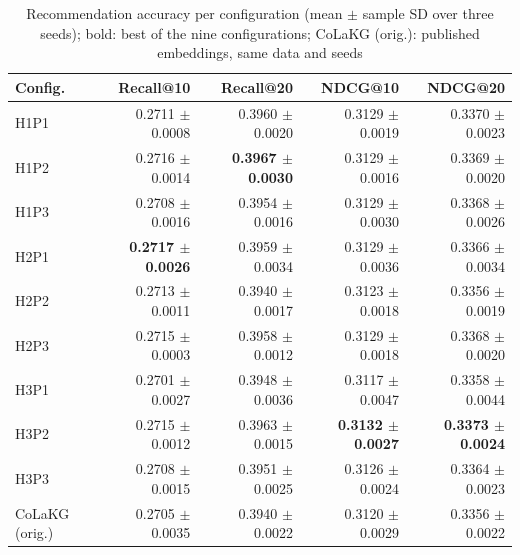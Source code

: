 \begin{table}[H]
\centering
\small
\begin{tabular}{lrrrr}
\toprule
Config. & Recall@10 & Recall@20 & NDCG@10 & NDCG@20 \\
\midrule
H1P1 & 0.2711 $\pm$ 0.0008 & 0.3960 $\pm$ 0.0020 & 0.3129 $\pm$ 0.0019 & 0.3370 $\pm$ 0.0023 \\
H1P2 & 0.2716 $\pm$ 0.0014 & \textbf{0.3967 $\pm$ 0.0030} & 0.3129 $\pm$ 0.0016 & 0.3369 $\pm$ 0.0020 \\
H1P3 & 0.2708 $\pm$ 0.0016 & 0.3954 $\pm$ 0.0016 & 0.3129 $\pm$ 0.0030 & 0.3368 $\pm$ 0.0026 \\
H2P1 & \textbf{0.2717 $\pm$ 0.0026} & 0.3959 $\pm$ 0.0034 & 0.3129 $\pm$ 0.0036 & 0.3366 $\pm$ 0.0034 \\
H2P2 & 0.2713 $\pm$ 0.0011 & 0.3940 $\pm$ 0.0017 & 0.3123 $\pm$ 0.0018 & 0.3356 $\pm$ 0.0019 \\
H2P3 & 0.2715 $\pm$ 0.0003 & 0.3958 $\pm$ 0.0012 & 0.3129 $\pm$ 0.0018 & 0.3368 $\pm$ 0.0020 \\
H3P1 & 0.2701 $\pm$ 0.0027 & 0.3948 $\pm$ 0.0036 & 0.3117 $\pm$ 0.0047 & 0.3358 $\pm$ 0.0044 \\
H3P2 & 0.2715 $\pm$ 0.0012 & 0.3963 $\pm$ 0.0015 & \textbf{0.3132 $\pm$ 0.0027} & \textbf{0.3373 $\pm$ 0.0024} \\
H3P3 & 0.2708 $\pm$ 0.0015 & 0.3951 $\pm$ 0.0025 & 0.3126 $\pm$ 0.0024 & 0.3364 $\pm$ 0.0023 \\
CoLaKG (orig.) & 0.2705 $\pm$ 0.0035 & 0.3940 $\pm$ 0.0022 & 0.3120 $\pm$ 0.0029 & 0.3356 $\pm$ 0.0022 \\
\bottomrule
\end{tabular}
\caption{Recommendation accuracy per configuration (mean $\pm$ sample SD over three seeds); bold: best of the nine configurations; CoLaKG (orig.): published embeddings, same data and seeds\RunTag}
\label{tab:main_results}
\end{table}
